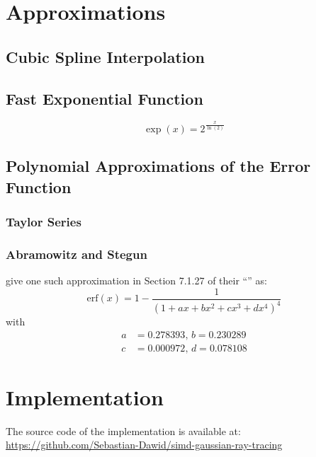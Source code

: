 \documentclass[a4paper, 11pt]{memoir}
\newcommand*{\erf}{\text{erf}}
\begin{document}
    \chapter{Approximations}
    \section{Cubic Spline Interpolation}

    \section{Fast Exponential Function}
    \cite{fast_exp}
    \begin{equation}
        \exp{(x)} = 2^{\frac{x}{\ln{(2)}}}
    \end{equation}
    
    \section{Polynomial Approximations of the Error Function}
    \subsection{Taylor Series}
    \subsection{Abramowitz and Stegun}
    \citeauthor{AbraSteg72} give one such approximation in Section 7.1.27 of their \enquote{}\cite{AbraSteg72} as:
    \begin{equation}
        \erf{(x)} = 1 - \frac{1}{(1 + ax + bx^2 + cx^3 + dx^4)^4}
    \end{equation}
    with
    \begin{align*}
        a &= 0.278393,\,
        b = 0.230289\\
        c &= 0.000972,\,
        d = 0.078108
    \end{align*}
    
    \chapter{Implementation}
    The source code of the implementation is available at: \href{https://github.com/Sebastian-Dawid/simd-gaussian-ray-tracing}{https://github.com/Sebastian-Dawid/simd-gaussian-ray-tracing}
\end{document}
